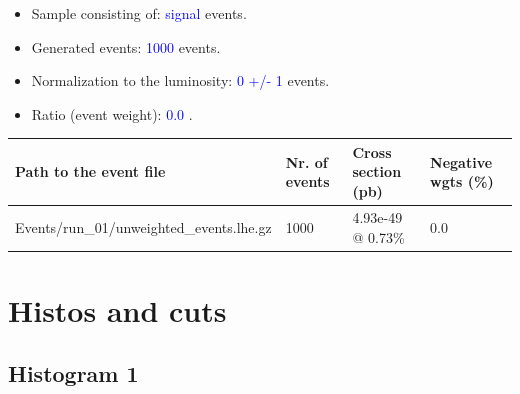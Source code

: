 \documentclass[a4paper, 10pt]{article}
\begin{document}
\begin{itemize}
  \item Sample consisting of: \textcolor{blue}{signal}  events.
   \item Generated events: \textcolor{blue}{1000 }  events.
   \item Normalization to the luminosity: \textcolor{blue}{0}\textcolor{blue}{ +/\-- }\textcolor{blue}{1 }  events.
   \item Ratio (event weight): \textcolor{blue}{0.0 } .  
 
\end{itemize}
\begin{table}[H]
  \begin{center}
    \begin{tabular}{|m{55.0mm}|m{25.0mm}|m{30.0mm}|m{30.0mm}|}
      \hline
      {\cellcolor{yellow}         Path to the event file}& {\cellcolor{yellow}         Nr. of events}& {\cellcolor{yellow}         Cross section (pb)}& {\cellcolor{yellow}         Negative wgts (\%)}\\
      \hline
      {\cellcolor{white}          Events/\-run\_01/\-unweighted\_events.lhe.gz}& {\cellcolor{white}          1000}& {\cellcolor{white}          4.93e-49 @ 0.73\%}& {\cellcolor{white}          0.0}\\
\hline
    \end{tabular}
  \end{center}
\end{table}

\newpage
\section{ Histos and cuts}

\subsection{ Histogram 1}
\end{document}
